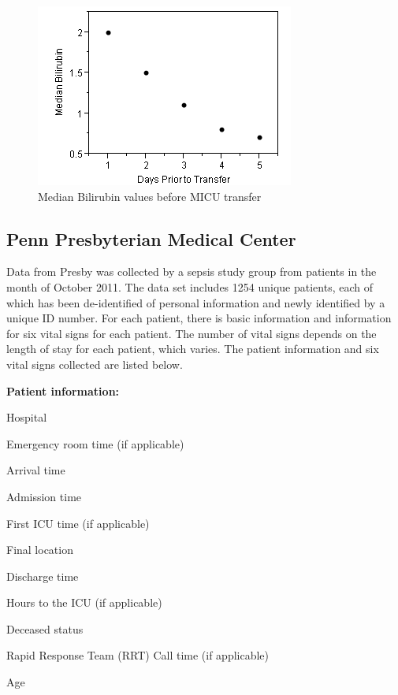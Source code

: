 \documentclass{sig-alternate}
\begin{document}
\begin{figure}
	\begin{center}
		\includegraphics[width=1.0\linewidth]{BilirubinGraph.png}
	\end{center}
	\caption{Median Bilirubin values before MICU transfer}
	\label{fig:bilirubin}
\end{figure}

\vspace{10pt}
\subsection{Penn Presbyterian Medical Center}
\label{subsec:presby}
\vspace{10pt}

Data from Presby was collected by a sepsis study group from patients in the month of October 2011.  The data set includes 1254 unique patients, each of which has been de-identified of personal information and newly identified by a unique ID number.  For each patient, there is basic information and information for six vital signs for each patient.  The number of vital signs depends on the length of stay for each patient, which varies.  The patient information and six vital signs collected are listed below.
\linebreak

\noindent \textbf{Patient information:}
\begin{itemize*}
  \item Hospital
  \item Emergency room time (if applicable)
  \item Arrival time
  \item Admission time
  \item First ICU time (if applicable)
  \item Final location
  \item Discharge time
  \item Hours to the ICU (if applicable)
  \item Deceased status
  \item Rapid Response Team (RRT) Call time (if applicable)
  \item Age
\end{itemize*}
\end{document}
